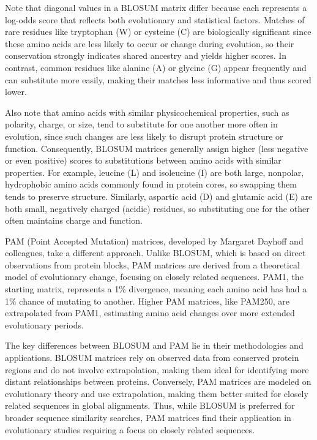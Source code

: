 Note that diagonal values in a BLOSUM matrix differ because each represents a log-odds score that reflects both evolutionary and statistical factors. Matches of rare residues like tryptophan (W) or cysteine (C) are biologically significant since these amino acids are less likely to occur or change during evolution, so their conservation strongly indicates shared ancestry and yields higher scores. In contrast, common residues like alanine (A) or glycine (G) appear frequently and can substitute more easily, making their matches less informative and thus scored lower.

Also note that amino acids with similar physicochemical properties, such as polarity, charge, or size, tend to substitute for one another more often in evolution, since such changes are less likely to disrupt protein structure or function. Consequently, BLOSUM matrices generally assign higher (less negative or even positive) scores to substitutions between amino acids with similar properties. For example, leucine (L) and isoleucine (I) are both large, nonpolar, hydrophobic amino acids commonly found in protein cores, so swapping them tends to preserve structure. Similarly, aspartic acid (D) and glutamic acid (E) are both small, negatively charged (acidic) residues, so substituting one for the other often maintains charge and function.

PAM (Point Accepted Mutation) matrices, developed by Margaret Dayhoff and colleagues, take a different approach. 
Unlike BLOSUM, which is based on direct observations from protein blocks, PAM matrices are derived from a theoretical model of evolutionary change, focusing on closely related sequences. PAM1, the starting matrix, represents a 1\% divergence, meaning each amino acid has had a 1\% chance of mutating to another. Higher PAM matrices, like PAM250, are extrapolated from PAM1, estimating amino acid changes over more extended evolutionary periods.

The key differences between BLOSUM and PAM lie in their methodologies and applications. BLOSUM matrices rely on observed data from conserved protein regions and do not involve extrapolation, making them ideal for identifying more distant relationships between proteins. Conversely, PAM matrices are modeled on evolutionary theory and use extrapolation, making them better suited for closely related sequences in global alignments. Thus, while BLOSUM is preferred for broader sequence similarity searches, PAM matrices find their application in evolutionary studies requiring a focus on closely related sequences.